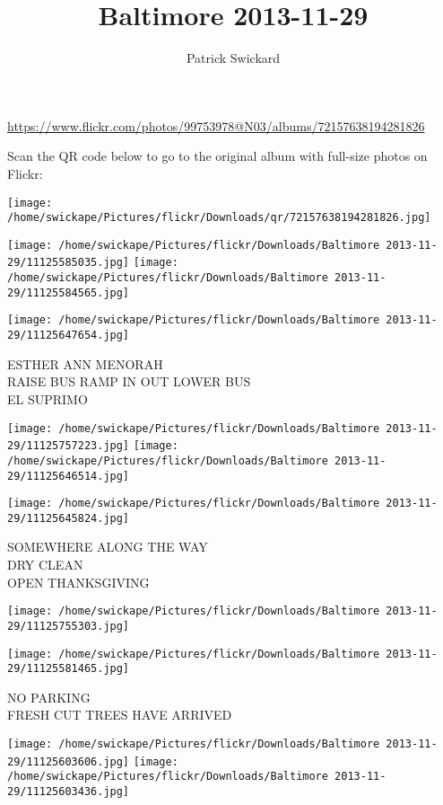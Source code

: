 \documentclass[10pt,letterpaper]{article}
\title{Baltimore 2013-11-29}
\author{Patrick Swickard}
\date{}
\begin{document}
\maketitle

\url{https://www.flickr.com/photos/99753978@N03/albums/72157638194281826}

Scan the QR code below to go to the original album with full-size photos on Flickr:

\texttt{[image: /home/swickape/Pictures/flickr/Downloads/qr/72157638194281826.jpg]}
\pagebreak

\texttt{[image: /home/swickape/Pictures/flickr/Downloads/Baltimore 2013-11-29/11125585035.jpg]}
\texttt{[image: /home/swickape/Pictures/flickr/Downloads/Baltimore 2013-11-29/11125584565.jpg]}

\vspace{0.25in}
\texttt{[image: /home/swickape/Pictures/flickr/Downloads/Baltimore 2013-11-29/11125647654.jpg]}

ESTHER ANN MENORAH\\
RAISE BUS RAMP IN OUT LOWER BUS\\
EL SUPRIMO
\pagebreak

\texttt{[image: /home/swickape/Pictures/flickr/Downloads/Baltimore 2013-11-29/11125757223.jpg]}
\texttt{[image: /home/swickape/Pictures/flickr/Downloads/Baltimore 2013-11-29/11125646514.jpg]}

\vspace{0.25in}
\texttt{[image: /home/swickape/Pictures/flickr/Downloads/Baltimore 2013-11-29/11125645824.jpg]}

SOMEWHERE ALONG THE WAY\\
DRY CLEAN\\
OPEN THANKSGIVING
\pagebreak

\texttt{[image: /home/swickape/Pictures/flickr/Downloads/Baltimore 2013-11-29/11125755303.jpg]}

\vspace{0.25in}
\texttt{[image: /home/swickape/Pictures/flickr/Downloads/Baltimore 2013-11-29/11125581465.jpg]}

NO PARKING\\
FRESH CUT TREES HAVE ARRIVED
\pagebreak

\texttt{[image: /home/swickape/Pictures/flickr/Downloads/Baltimore 2013-11-29/11125603606.jpg]}
\texttt{[image: /home/swickape/Pictures/flickr/Downloads/Baltimore 2013-11-29/11125603436.jpg]}
\end{document}
